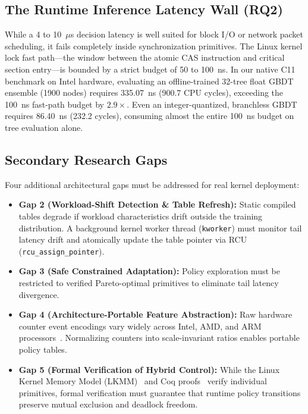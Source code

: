 \documentclass[conference]{IEEEtran}
\begin{document}
\subsection{The Runtime Inference Latency Wall (RQ2)}
While a 4 to 10~$\mu$s decision latency is well suited for block I/O or network packet scheduling, it fails completely inside synchronization primitives. The Linux kernel lock fast path---the window between the atomic CAS instruction and critical section entry---is bounded by a strict budget of 50 to 100~ns. In our native C11 benchmark on Intel hardware, evaluating an offline-trained 32-tree float GBDT ensemble (1900 nodes) requires 335.07~ns (900.7 CPU cycles), exceeding the 100~ns fast-path budget by $2.9\times$. Even an integer-quantized, branchless GBDT requires 86.40~ns (232.2 cycles), consuming almost the entire 100~ns budget on tree evaluation alone.

\subsection{Secondary Research Gaps}
Four additional architectural gaps must be addressed for real kernel deployment:
\begin{itemize}
    \item \textbf{Gap 2 (Workload-Shift Detection \& Table Refresh):} Static compiled tables degrade if workload characteristics drift outside the training distribution. A background kernel worker thread (\texttt{kworker}) must monitor tail latency drift and atomically update the table pointer via RCU (\texttt{rcu\_assign\_pointer}).
    \item \textbf{Gap 3 (Safe Constrained Adaptation):} Policy exploration must be restricted to verified Pareto-optimal primitives to eliminate tail latency divergence.
    \item \textbf{Gap 4 (Architecture-Portable Feature Abstraction):} Raw hardware counter event encodings vary widely across Intel, AMD, and ARM processors~\cite{intel2024sdm}. Normalizing counters into scale-invariant ratios enables portable policy tables.
    \item \textbf{Gap 5 (Formal Verification of Hybrid Control):} While the Linux Kernel Memory Model (LKMM)~\cite{alglave2018frightening} and Coq proofs~\cite{tassarotti2015verifying} verify individual primitives, formal verification must guarantee that runtime policy transitions preserve mutual exclusion and deadlock freedom.
\end{itemize}
\end{document}
